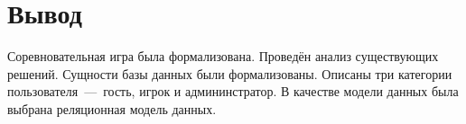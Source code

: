 \section*{Вывод}

Соревновательная игра была формализована. Проведён анализ существующих решений. Сущности базы данных были формализованы. Описаны три категории пользователя~---~гость, игрок и админинстратор. В качестве модели данных была выбрана реляционная модель данных. 

\clearpage
